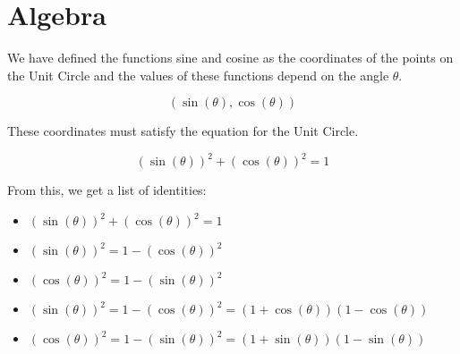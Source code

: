 \documentclass{ximera}
\begin{document}
\section{Algebra}

We have defined the functions sine and cosine as the coordinates of the points on the Unit Circle and the values of these functions depend on the angle $\theta$.

\[    ( \sin(\theta), \cos(\theta) ) \]


These coordinates must satisfy the equation for the Unit Circle. 



\[    ( \sin(\theta) )^2 + ( \cos(\theta) )^2 = 1 \]



From this, we get a list of identities:



\begin{observation}


\begin{itemize}
\item $( \sin(\theta) )^2 + ( \cos(\theta) )^2 = 1$
\item $( \sin(\theta) )^2 =  1 - ( \cos(\theta) )^2$
\item $( \cos(\theta) )^2 =  1 - ( \sin(\theta) )^2$
\item $( \sin(\theta) )^2 =  1 - ( \cos(\theta) )^2 = (1 + \cos(\theta))(1 - \cos(\theta))$
\item $( \cos(\theta) )^2 =  1 - ( \sin(\theta) )^2 = (1 + \sin(\theta))(1 - \sin(\theta))$
\end{itemize}


\end{observation}
\end{document}
